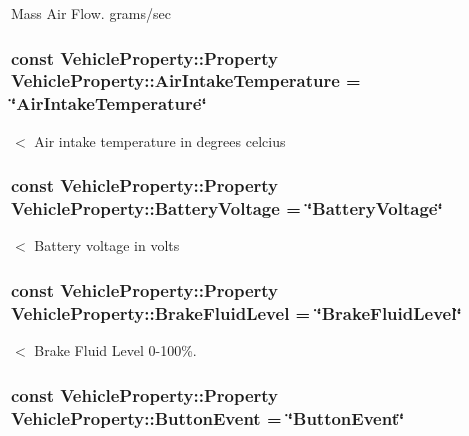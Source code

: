 Mass Air Flow. grams/sec \hypertarget{classVehicleProperty_af4cbbae11228729335c50aa2d1fa2e28}{
\subsubsection[{Air\-Intake\-Temperature}]{\setlength{\rightskip}{0pt plus 5cm}const Vehicle\-Property\-::\-Property Vehicle\-Property\-::\-Air\-Intake\-Temperature = \char`\"{}Air\-Intake\-Temperature\char`\"{}\hspace{0.3cm}{\ttfamily [static]}}}\label{classVehicleProperty_af4cbbae11228729335c50aa2d1fa2e28}
$<$ Air intake temperature in degrees celcius \hypertarget{classVehicleProperty_a43a70a277b955ae35a9ba795d2052591}{
\subsubsection[{Battery\-Voltage}]{\setlength{\rightskip}{0pt plus 5cm}const Vehicle\-Property\-::\-Property Vehicle\-Property\-::\-Battery\-Voltage = \char`\"{}Battery\-Voltage\char`\"{}\hspace{0.3cm}{\ttfamily [static]}}}\label{classVehicleProperty_a43a70a277b955ae35a9ba795d2052591}
$<$ Battery voltage in volts \hypertarget{classVehicleProperty_a83bc635222e9ba14dfa134defa21e825}{
\subsubsection[{Brake\-Fluid\-Level}]{\setlength{\rightskip}{0pt plus 5cm}const Vehicle\-Property\-::\-Property Vehicle\-Property\-::\-Brake\-Fluid\-Level = \char`\"{}Brake\-Fluid\-Level\char`\"{}\hspace{0.3cm}{\ttfamily [static]}}}\label{classVehicleProperty_a83bc635222e9ba14dfa134defa21e825}
$<$ Brake Fluid Level 0-\/100\%. \hypertarget{classVehicleProperty_ab9fa252d209fbd2eb014c4d934d3d615}{
\subsubsection[{Button\-Event}]{\setlength{\rightskip}{0pt plus 5cm}const Vehicle\-Property\-::\-Property Vehicle\-Property\-::\-Button\-Event = \char`\"{}Button\-Event\char`\"{}\hspace{0.3cm}{\ttfamily [static]}}}\label{classVehicleProperty_ab9fa252d209fbd2eb014c4d934d3d615}
